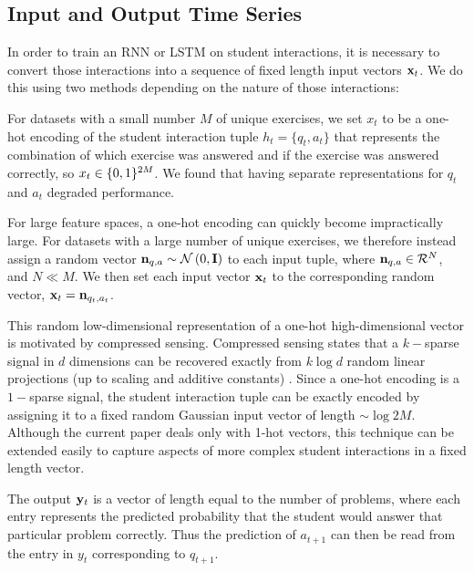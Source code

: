 \subsection{Input and Output Time Series}

In order to train an RNN or LSTM on student interactions, it is necessary to convert those interactions into a sequence of fixed length input vectors $\mathbf x_t$.
We do this using two methods depending on the nature of those interactions:


For datasets with a small number $M$ of unique exercises, we set $x_t$ to be a one-hot encoding of the student interaction tuple $h_t = \{q_t, a_t\}$ that represents the combination of which exercise was answered and if the exercise was answered correctly, so $x_t \in \mathcal \{0,1\}^{2M}$. We found that having separate representations for $q_t$ and $a_t$ degraded performance.

For large feature spaces, a one-hot encoding can quickly become impractically large.
For datasets with a large number of unique exercises, we therefore instead assign a random vector $\mathbf n_{q, a} \sim \mathcal N\left(0, \mathbf I\right)$ to each input tuple, where $\mathbf n_{q, a} \in \mathcal R^N$, and $N \ll M$. We then set each input vector $\mathbf x_t$ to the corresponding random vector, $\mathbf x_t = \mathbf n_{q_t, a_t}$.

This random low-dimensional representation of a one-hot high-dimensional vector is motivated by compressed sensing.
Compressed sensing states that a $k-$sparse signal in $d$ dimensions can be recovered exactly from $k \log d$ random linear projections (up to scaling and additive constants) \cite{baraniuk2007compressive}. %
Since a one-hot encoding is a $1-$sparse signal, the student interaction tuple can be exactly encoded by assigning it to a fixed random Gaussian input vector of length $\sim \log 2M$.
Although the current paper deals only with 1-hot vectors, this technique can be extended easily to capture aspects of more complex student interactions in a fixed length vector.%


The output $\mathbf y_t$ is a vector of length equal to the number of problems, where each entry represents the predicted probability that the student would answer that particular problem correctly.
Thus the prediction of $a_{t+1}$ can then be read from the entry in $y_{t}$ corresponding to $q_{t+1}$.


